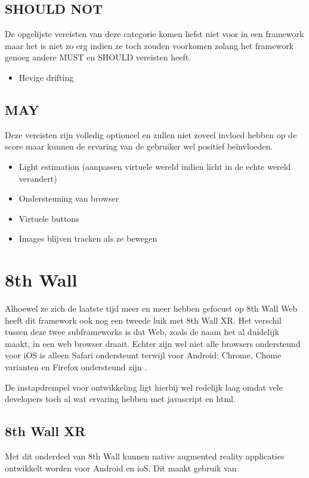 \subsection{SHOULD NOT}
De opgelijste vereisten van deze categorie komen liefst niet voor in een framework maar het is niet zo erg indien ze toch zouden voorkomen zolang het framework genoeg andere MUST en SHOULD vereisten heeft.
\begin{itemize}
    \item Hevige drifting
\end{itemize} 

\subsection{MAY}
Deze vereisten zijn volledig optioneel en zullen niet zoveel invloed hebben op de score maar kunnen de ervaring van de gebruiker wel positief beïnvloeden.
\begin{itemize}
    \item Light estimation (aanpassen virtuele wereld indien licht in de echte wereld verandert)
    \item Ondersteuning van browser
     \item Virtuele buttons
     \item Images blijven tracken als ze bewegen
\end{itemize} 

\section{8th Wall}
Alhoewel ze zich de laatste tijd meer en meer hebben gefocust op 8th Wall Web heeft dit framework ook nog een tweede luik met 8th Wall XR. Het verschil tussen deze twee subframeworks is dat Web, zoals de naam het al duidelijk maakt, in een web browser draait. Echter zijn wel niet alle browsers ondersteund voor iOS is alleen Safari ondersteunt terwijl voor Android: Chrome, Chome varianten en Firefox ondersteund zijn \autocite{8thWallWebReq}.

De instapdrempel voor ontwikkeling ligt hierbij wel redelijk laag omdat vele developers toch al wat ervaring hebben met javascript en html.

\subsection{8th Wall XR}
Met dit onderdeel van 8th Wall kunnen native augmented reality applicaties ontwikkelt worden voor Android en ioS. Dit maakt gebruik van



